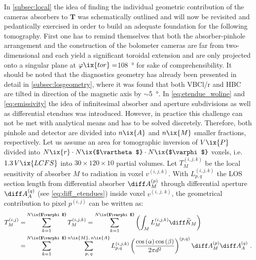         In \cref{subsec:local} the idea of finding the individual geometric contribution of the cameras absorbers to $\mathbf{T}$ was schematically outlined and will now be revisited and pedantically exercised in order to build an adequate foundation for the following tomography. First one has to remind themselves that both the absorber-pinhole arrangement and the construction of the bolometer cameras are far from two-dimensional and each yield a significant toroidal extension and are only projected onto a singular plane at $\varphi\ix{tor}=$\SI{108}{\degree} for sake of comprehensibility. It should be noted that the diagnostics geometry has already been presented in detail in \cref{subsec:losgeometry}, where it was found that both VBCl/r and HBC are tilted in direction of the magnetic axis by $\sim$\SI{5}{\degree}. In \cref{eq:etendue_woline} and \cref{eq:emissivity} the idea of infinitesimal absorber and aperture subdivisions as well as differential etendues was introduced. However, in practice this challenge can not be met with analytical means and has to be solved discretely. Therefore, both pinhole and detector are divided into $n\ix{A}$ and $n\ix{M}$ smaller fractions, respectively. Let us assume an area for tomographic inversion of $V\ix{P}$ divided into $N\ix{r}\cdot N\ix{$\vartheta$}\cdot N\ix{$\varphi$}$ voxels, i.e. $1.3\,V\ix{LCFS}$ into $30\times120\times10$ partial volumes. Let $T^{\left(i,j,k\right)}_{M}$ be the local sensitivity of absorber $M$ to radiation in voxel $v^{\left(i,j,k\right)}$. With $L^{\left(i,j,k\right)}_{p,q}$ the LOS section length from differential absorber $\diff A_{M}^{\left(p\right)}$ through differential aperture $\diff A_{A}^{\left(q\right)}$ (see \cref{eq:diff_etendues}) inside voxel $v^{\left(i,\,j,\,k\right)}$, the geometrical contribution to pixel $p^{\left(i,j\right)}$ can be written as:
%
        \begin{align}%
            \begin{split}%
                T^{\left(i,j\right)}_{M}=&\sum_{k=1}^{N\ix{$\varphi$}}T^{\left(i,j,k\right)}_{M}=\sum_{k=1}^{N\ix{$\varphi$}}\left(\int_{M}L^{\left(i,j,k\right)}_{M}\diff\widetilde{K}_{M}\right)\\%
                =&\sum_{k=1}^{N\ix{$\varphi$}}\sum_{p,\,q}^{n\ix{M},\,n\ix{A}}L^{\left(i,j,k\right)}_{p,q}\left(\frac{\cos\left(\alpha\right)\cos\left(\beta\right)}{2\pi d^{2}}\right)^{\left(p,q\right)}\diff A_{M}^{\left(p\right)}\diff A_{A}^{\left(q\right)}\,\,.%
            \end{split}\label{eq:discrete_emissivity}%
        \end{align}%
